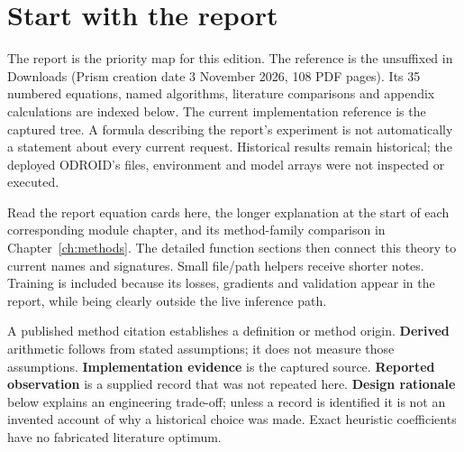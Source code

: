 \chapter{Start with the report}
\label{ch:report-first}
The report is the priority map for this edition. The reference is the unsuffixed
 in Downloads (Prism creation date
3 November 2026, 108 PDF pages). Its 35 numbered equations, named algorithms,
literature comparisons and appendix calculations are indexed below. The current
implementation reference is the captured  tree. A formula
describing the report's experiment is not automatically a statement about every
current request. Historical results remain historical; the deployed ODROID's
files, environment and model arrays were not inspected or executed.

Read the report equation cards here, the longer explanation at the start of
each corresponding module chapter, and its method-family comparison in
Chapter~\ref{ch:methods}. The detailed function sections then connect this theory
to current names and signatures. Small file/path helpers receive shorter notes.
Training is included because its losses, gradients and validation appear in the
report, while being clearly outside the live inference path.

A published method citation establishes a definition or method origin.
\textbf{Derived} arithmetic follows from stated assumptions; it does not measure
those assumptions. \textbf{Implementation evidence} is the captured source.
\textbf{Reported observation} is a supplied record that was not repeated here.
\textbf{Design rationale} below explains an engineering trade-off; unless a
record is identified it is not an invented account of why a historical choice
was made. Exact heuristic coefficients have no fabricated literature optimum.

